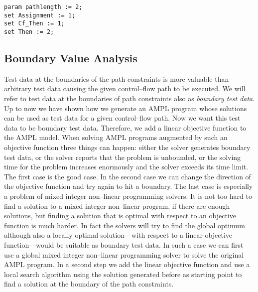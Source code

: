 \documentclass[runningheads,a4paper]{llncs}%
\newcommand{\UMLType}[1]{\textsf{\textit{#1}}} %
\begin{document}
\begin{lstlisting}[basicstyle=\ttfamily,language=ampl]
param pathlength := 2;
set Assignment := 1;
set Cf_Then := 1;
set Then := 2;
\end{lstlisting}%
\subsection{Boundary Value Analysis}%
\label{sec:BoundaryValueAnalysis}%
Test data at the boundaries of the path constraints is more valuable than arbitrary test data causing the given control--flow path to be executed. We will refer to test data at the boundaries of path constraints also as \emph{boundary test data}. Up to now we have shown how we generate an AMPL program whose solutions can be used as test data for a given control--flow path. Now we want this test data to be boundary test data. Therefore, we add a linear objective function to the AMPL model. When solving AMPL programs augmented by such an objective function three things can happen: either the solver generates boundary test data, or the solver reports that the problem is unbounded, or the solving time for the problem increases enormously and the solver exceeds its time limit. The first case is the good case. In the second case we can change the direction of the objective function and try again to hit a boundary. The last case is especially a problem of mixed integer non--linear programming solvers. It is not too hard to find a solution to a mixed integer non--linear program, if there are enough solutions, but finding a solution that is optimal with respect to an objective function is much harder. In fact the solvers will try to find the global optimum although also a locally optimal solution---with respect to a linear objective function---would be suitable as boundary test data. In such a case we can first use a global mixed integer non--linear programming solver to solve the original AMPL program. In a second step we add the linear objective function and use a local search algorithm using the solution generated before as starting point to find a solution at the boundary of the path constraints.
\end{document}
